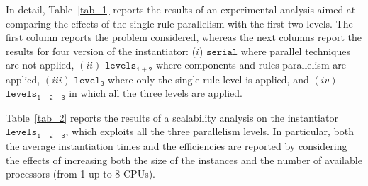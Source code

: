 \documentclass[preprint]{tlp}
\newcommand{\serial}{\ensuremath{\mathtt{serial}}\xspace}
\newcommand{\kali}{\ensuremath{\mathtt{levels_{1\!+\!2}}}\xspace}
\newcommand{\splitonly}{\ensuremath{\mathtt{level_3}}\xspace}
\newcommand{\paral}{\ensuremath{\mathtt{levels_{1\!+\!2\!+\!3}}}\xspace}
\begin{document}
In detail, Table~\ref{tab_1} reports the results of an experimental analysis aimed at comparing the
effects of the single rule parallelism with the first two levels.
The first column reports the problem considered, whereas the
next columns report the results for four version of the instantiator:
($i$) \serial where parallel techniques are not applied,
$(ii)$ \kali where components and rules parallelism are applied,
$(iii)$ \splitonly where only the single rule level is applied, and
$(iv)$ \paral in which all the three levels are applied.


Table~\ref{tab_2} reports the results of a scalability analysis on the instantiator \paral,
which exploits all the three parallelism levels. In particular, both the average instantiation times 
and the efficiencies are reported by considering the effects of increasing both the size of the instances 
and the number of available processors (from 1 up to 8 CPUs).
\end{document}
